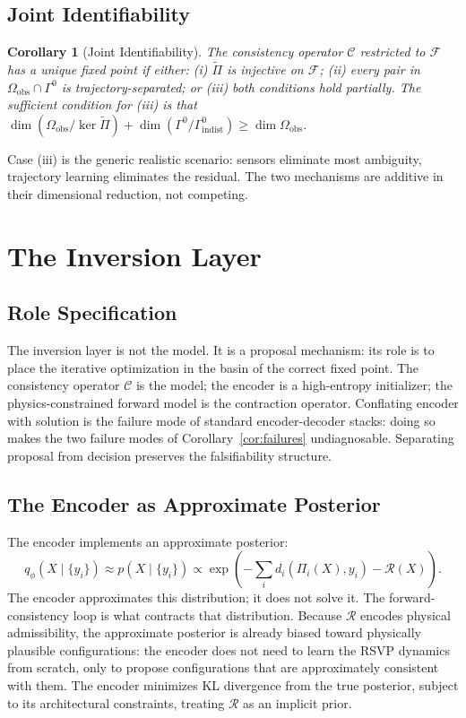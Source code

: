 \documentclass[12pt, oneside]{article}
\newtheorem{corollary}[theorem]{Corollary}
\newcommand{\Ftil}{\widetilde{\Pi}}
\begin{document}
\subsection{Joint Identifiability}

\begin{corollary}[Joint Identifiability]
The consistency operator $\mathcal{C}$ restricted to $\mathcal{F}$ has a unique fixed point
if either: (i) $\Ftil$ is injective on $\mathcal{F}$; (ii) every pair in
$\Omega_{\mathrm{obs}} \cap \Gamma^0$ is trajectory-separated; or (iii) both conditions
hold partially. The sufficient condition for (iii) is that $\dim(\Omega_{\mathrm{obs}}/\ker\Ftil)
+ \dim(\Gamma^0/\Gamma^0_{\mathrm{indist}}) \ge \dim\Omega_{\mathrm{obs}}$.
\end{corollary}

Case (iii) is the generic realistic scenario: sensors eliminate most ambiguity, trajectory
learning eliminates the residual. The two mechanisms are additive in their dimensional
reduction, not competing.

\section{The Inversion Layer}
\label{sec:inversion}

\subsection{Role Specification}

The inversion layer is not the model. It is a proposal mechanism: its role is to place
the iterative optimization in the basin of the correct fixed point. The consistency
operator $\mathcal{C}$ is the model; the encoder is a high-entropy initializer; the
physics-constrained forward model is the contraction operator. Conflating encoder with
solution is the failure mode of standard encoder-decoder stacks: doing so makes the two
failure modes of Corollary~\ref{cor:failures} undiagnosable. Separating proposal from
decision preserves the falsifiability structure.

\subsection{The Encoder as Approximate Posterior}

The encoder implements an approximate posterior:
\[
q_\phi(X \mid \{y_i\}) \approx p(X \mid \{y_i\}) \propto
\exp\!\left(-\sum_i d_i(\Pi_i(X), y_i) - \mathcal{R}(X)\right).
\]
The encoder approximates this distribution; it does not solve it. The forward-consistency
loop is what contracts that distribution. Because $\mathcal{R}$ encodes physical
admissibility, the approximate posterior is already biased toward physically plausible
configurations: the encoder does not need to learn the RSVP dynamics from scratch, only
to propose configurations that are approximately consistent with them. The encoder
minimizes KL divergence from the true posterior, subject to its architectural constraints,
treating $\mathcal{R}$ as an implicit prior.
\end{document}
